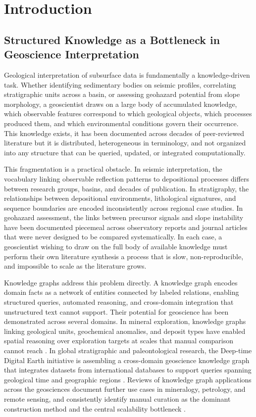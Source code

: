 \documentclass[10pt]{article}
\begin{document}
\section{Introduction}
\label{sec:intro}

\subsection{Structured Knowledge as a Bottleneck in Geoscience Interpretation}

Geological interpretation of subsurface data is fundamentally a
knowledge-driven task. Whether identifying sedimentary bodies on
seismic profiles, correlating stratigraphic units across a basin, or
assessing geohazard potential from slope morphology, a geoscientist
draws on a large body of accumulated knowledge, which observable
features correspond to which geological objects, which processes
produced them, and which environmental conditions govern their
occurrence. This knowledge exists, it has been documented across
decades of peer-reviewed literature but it is distributed,
heterogeneous in terminology, and not organized into any structure
that can be queried, updated, or integrated computationally.

This fragmentation is a practical obstacle. In seismic
interpretation, the vocabulary linking observable reflection patterns
to depositional processes differs between research groups, basins,
and decades of publication. In stratigraphy, the relationships
between depositional environments, lithological signatures, and
sequence boundaries are encoded inconsistently across regional case
studies. In geohazard assessment, the links between precursor signals
and slope instability have been documented piecemeal across
observatory reports and journal articles that were never designed to
be compared systematically. In each case, a geoscientist wishing to
draw on the full body of available knowledge must perform their own
literature synthesis  a process that is slow, non-reproducible,
and impossible to scale as the literature grows.

Knowledge graphs address this problem directly. A knowledge graph
encodes domain facts as a network of entities connected by labeled
relations, enabling structured queries, automated reasoning, and
cross-domain integration that unstructured text cannot support. Their
potential for geoscience has been demonstrated across several domains.
In mineral exploration, knowledge graphs linking geological units,
geochemical anomalies, and deposit types have enabled spatial
reasoning over exploration targets at scales that manual comparison
cannot reach \citep{jes-34-5-1374}. In global stratigraphic and
paleontological research, the Deep-time Digital Earth initiative is
assembling a cross-domain geoscience knowledge graph that integrates
datasets from international databases to support queries spanning
geological time and geographic regions \citep{dde2025}. Reviews of
knowledge graph applications across the geosciences document further
use cases in mineralogy, petrology, and remote sensing, and
consistently identify manual curation as the dominant construction
method and the central scalability bottleneck
\citep{ma2022geoscience}.
\end{document}
